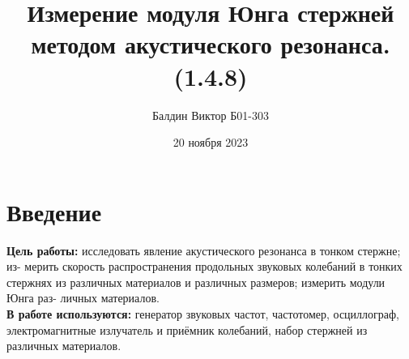\documentclass[a4, 12pt]{article}
\title{\textbf{Измерение модуля Юнга стержней методом акустического резонанса. (1.4.8)}}
\author{Балдин Виктор Б01-303}
\date{20 ноября 2023}
\begin{document}
	\maketitle

	\section{Введение}
    \textbf{Цель работы:} исследовать явление акустического резонанса в тонком стержне; из-
мерить скорость распространения продольных звуковых колебаний в тонких стержнях из различных материалов и различных размеров; измерить модули Юнга раз-
личных материалов.\\
\textbf{В работе используются:} генератор звуковых частот, частотомер, осциллограф,
электромагнитные излучатель и приёмник колебаний, набор стержней из различных материалов.
\end{document}
